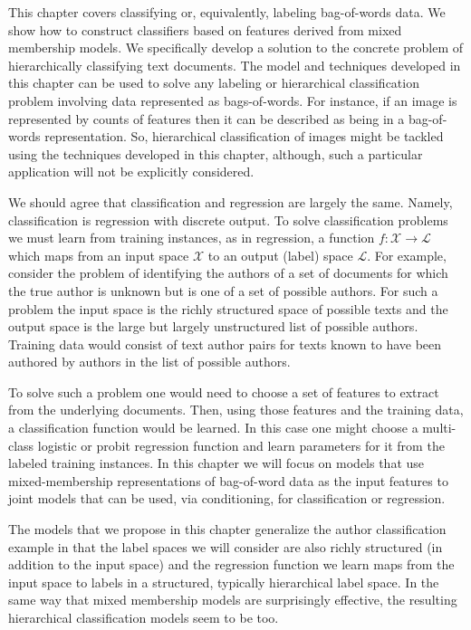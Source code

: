 This chapter covers classifying or, equivalently, labeling bag-of-words data.  We show how to construct classifiers based on features derived from mixed membership models.  We specifically develop a solution to the concrete problem of hierarchically classifying text documents.  The model and techniques developed in this chapter can be used to solve any labeling or hierarchical classification problem involving data represented as bags-of-words.  For instance,  if an image is represented by counts of features then it can be described as being in a bag-of-words representation.   So, hierarchical classification of images might be tackled using the techniques developed in this chapter, although, such a particular application will not be explicitly considered.

We should agree that classification and regression are largely the same.  Namely, classification is regression with discrete output.  To solve classification problems we must learn from training instances, as in regression, a function $f : \mathcal{X} \rightarrow \mathcal{L}$ which maps from an input space $\mathcal{X}$ to an output (label) space $\mathcal{L}$.   For example, consider the problem of identifying the authors of a set of documents for which the true author is unknown but is one of a set of possible authors.   For such a problem the input space is the richly structured space of possible texts and the output space is the large but largely unstructured list of possible authors.  Training data would consist of text author pairs for texts known to have been authored by authors in the list of possible authors.

To solve such a problem one would need to choose a set of features to extract from the underlying documents. Then, using those features and the training data, a classification function would be learned.  In this case one might choose a multi-class logistic or probit regression function and learn parameters for it from the labeled training instances.   In this chapter we will focus on models that use mixed-membership representations of bag-of-word data as the input features to joint models that can be used, via conditioning, for classification or regression.

The models that we propose in this chapter generalize the author classification example in that the label spaces we will consider are also richly structured (in addition to the input space) and the regression function we learn maps from the input space to labels in a structured, typically hierarchical label space.  In the same way that mixed membership models are surprisingly effective, the resulting hierarchical classification models seem to be too.

